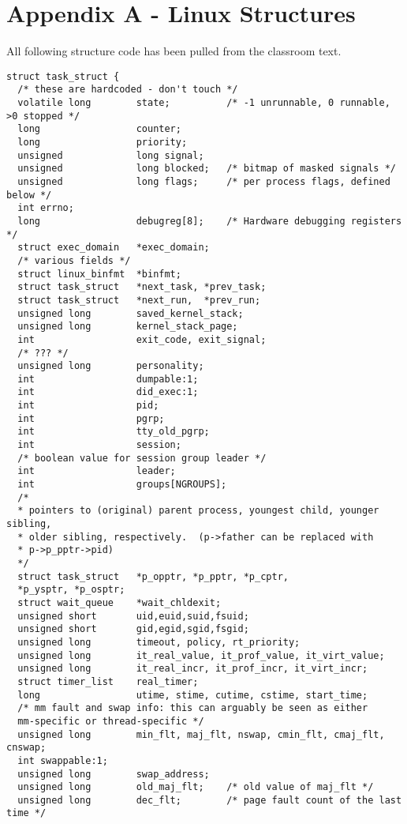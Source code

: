 \documentclass[10pt,letterpaper,onecolumn,draftclsnofoot]{IEEEtran}
\begin{document}
\section{Appendix A - Linux Structures}
All following structure code has been pulled from the classroom text.
\cite{robertlove2010}
\begin{lstlisting}[caption=The Linux task\_struct is responsible for keeping track of the state of each process.]
struct task_struct {
  /* these are hardcoded - don't touch */
  volatile long        state;          /* -1 unrunnable, 0 runnable, >0 stopped */
  long                 counter;
  long                 priority;
  unsigned             long signal;
  unsigned             long blocked;   /* bitmap of masked signals */
  unsigned             long flags;     /* per process flags, defined below */
  int errno;
  long                 debugreg[8];    /* Hardware debugging registers */
  struct exec_domain   *exec_domain;
  /* various fields */
  struct linux_binfmt  *binfmt;
  struct task_struct   *next_task, *prev_task;
  struct task_struct   *next_run,  *prev_run;
  unsigned long        saved_kernel_stack;
  unsigned long        kernel_stack_page;
  int                  exit_code, exit_signal;
  /* ??? */
  unsigned long        personality;
  int                  dumpable:1;
  int                  did_exec:1;
  int                  pid;
  int                  pgrp;
  int                  tty_old_pgrp;
  int                  session;
  /* boolean value for session group leader */
  int                  leader;
  int                  groups[NGROUPS];
  /*
  * pointers to (original) parent process, youngest child, younger sibling,
  * older sibling, respectively.  (p->father can be replaced with
  * p->p_pptr->pid)
  */
  struct task_struct   *p_opptr, *p_pptr, *p_cptr,
  *p_ysptr, *p_osptr;
  struct wait_queue    *wait_chldexit;
  unsigned short       uid,euid,suid,fsuid;
  unsigned short       gid,egid,sgid,fsgid;
  unsigned long        timeout, policy, rt_priority;
  unsigned long        it_real_value, it_prof_value, it_virt_value;
  unsigned long        it_real_incr, it_prof_incr, it_virt_incr;
  struct timer_list    real_timer;
  long                 utime, stime, cutime, cstime, start_time;
  /* mm fault and swap info: this can arguably be seen as either
  mm-specific or thread-specific */
  unsigned long        min_flt, maj_flt, nswap, cmin_flt, cmaj_flt, cnswap;
  int swappable:1;
  unsigned long        swap_address;
  unsigned long        old_maj_flt;    /* old value of maj_flt */
  unsigned long        dec_flt;        /* page fault count of the last time */

\end{lstlisting}
\end{document}
